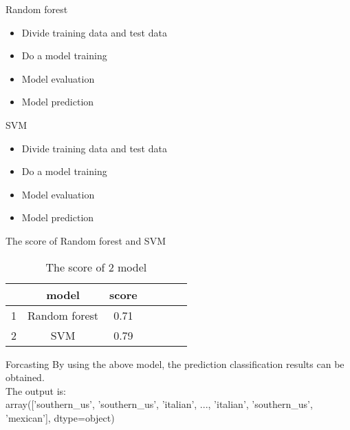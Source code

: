 \documentclass[
 size=12pt,
 paper=smartboard, %
 mode=present, %
 display=slides, %
style=tuliplab,
pauseslide,
fleqn,leqno]{powerdot}
\begin{document}
\begin{slide}[toc=,bm=]{ Random forest}
\begin{itemize}
  \item Divide training data and test data
  \item Do a model training
  \item Model evaluation
  \item Model prediction
\end{itemize}
\end{slide}

\begin{slide}[toc=,bm=]{SVM}
  \begin{itemize}
    \item Divide training data and test data
    \item Do a model training
    \item Model evaluation
    \item Model prediction
  \end{itemize}
\end{slide}

\begin{slide}[toc=,bm=]{The score of Random forest and SVM}
  \begin{table}[htbp]  \centering
    \caption{The score of 2 model}
    \label{tbl:data information}
    \begin{tabular}{ccccccc}
      \hline
        & model          & score \\
      \hline
      1 &  Random forest & 0.71  \\
      2 &  SVM           & 0.79  \\
      \hline 
    \end{tabular}
  \end{table}
\end{slide}


\begin{slide}[toc=,bm=]{Forcasting}
  By using the above model, the prediction classification results can be obtained.\\ 
\vspace{0.5cm}  The output is:\\
\vspace{0.5cm} array(['southern_us', 'southern_us', 'italian', ..., 'italian',
'southern_us', 'mexican'], dtype=object)
\end{slide}
\end{document}
